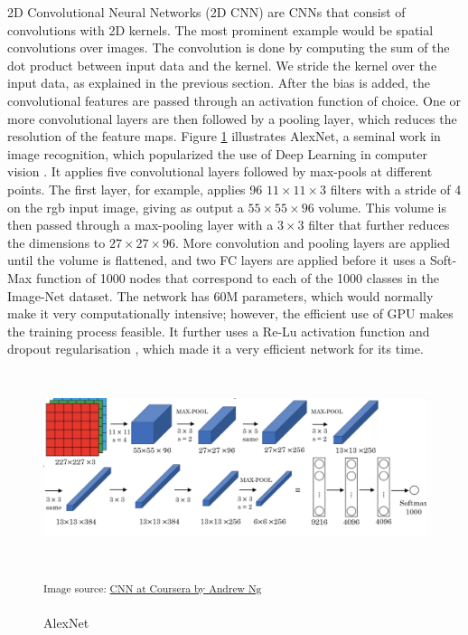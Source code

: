 \documentclass[extern,palatino]{cgMA}
\begin{document}
2D Convolutional Neural Networks (2D CNN) are CNNs that consist of convolutions with 2D kernels. The most prominent example would be spatial convolutions over images. The convolution is done by computing the sum of the dot product between input data and the kernel. We stride the kernel over the input data, as explained in the previous section. After the bias is added, the convolutional features are passed through an activation function of choice. One or more convolutional layers are then followed by a pooling layer, which reduces the resolution of the feature maps. Figure \ref{alexnet} illustrates AlexNet, a seminal work in image recognition, which popularized the use of Deep Learning in computer vision \cite{krizhevsky2012imagenet}. It applies five convolutional layers followed by max-pools at different points. The first layer, for example, applies 96 $11 \times 11 \times 3$ filters with a stride of 4 on the rgb input image, giving as output a $55 \times 55 \times 96$ volume. This volume is then passed through a max-pooling layer with a $3 \times 3$ filter that further reduces the dimensions to $27 \times 27 \times 96$. More convolution and pooling layers are applied until the volume is flattened, and two FC layers are applied before it uses a Soft-Max function of 1000 nodes that correspond to each of the 1000 classes in the Image-Net dataset. The network has 60M parameters, which would normally make it very computationally intensive; however, the efficient use of GPU makes the training process feasible. It further uses a Re-Lu activation function \cite{glorot2011deep} and dropout regularisation \cite{hinton2012improving}, which made it a very efficient network for its time.

\begin{figure}[h]
\center
\includegraphics[height={160pt}, width={440pt}]{images/alexnet.png}
\caption{AlexNet}
\small\textsuperscript{Image source: \href{https://www.coursera.org/learn/convolutional-neural-networks}{CNN at Coursera by Andrew Ng}}
\label{alexnet}
\end{figure}
\end{document}
